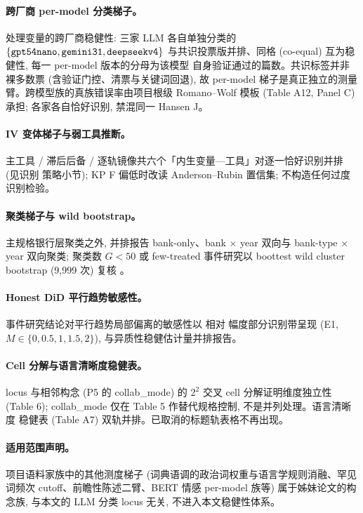 \paragraph{跨厂商 per-model 分类梯子。}
处理变量的跨厂商稳健性: 三家 LLM 各自单独分类的
$\{\texttt{gpt54nano},\texttt{gemini31},\texttt{deepseekv4}\}$
与共识投票版并排、同格 (co-equal) 互为稳健性, 每一 per-model 版本的分母为该模型
自身验证通过的篇数。共识标签并非裸多数票 (含验证门控、清票与关键词回退), 故
per-model 梯子是真正独立的测量臂。跨模型族的真族错误率由项目根级 Romano--Wolf
模板 (Table A12, Panel C) 承担; 各家各自恰好识别, 禁混同一 Hansen J。

\paragraph{IV 变体梯子与弱工具推断。}
主工具 / 滞后后备 / 逐轨镜像共六个「内生变量—工具」对逐一恰好识别并排 (见识别
策略小节); KP F 偏低时改读 Anderson--Rubin 置信集; 不构造任何过度识别检验。

\paragraph{聚类梯子与 wild bootstrap。}
主规格银行层聚类之外, 并排报告 bank-only、bank $\times$ year 双向与 bank-type
$\times$ year 双向聚类; 聚类数 $G<50$ 或 few-treated 事件研究以 boottest wild
cluster bootstrap (9{,}999 次) 复核 \parencite{roodman2019boottest}。

\paragraph{Honest DiD 平行趋势敏感性。}
事件研究结论对平行趋势局部偏离的敏感性以 \textcite{rambachan2023honestdid} 相对
幅度部分识别带呈现 (E1, $M \in \{0,0.5,1,1.5,2\}$), 与异质性稳健估计量并排报告。

\paragraph{Cell 分解与语言清晰度稳健表。}
locus 与相邻构念 (P5 的 collab\_mode) 的 $2^2$ 交叉 cell 分解证明维度独立性
(Table 6); collab\_mode 仅在 Table 5 作替代规格控制, 不是并列处理。语言清晰度
稳健表 (Table A7) 双轨并排。已取消的标题轨表格不再出现。

\paragraph{适用范围声明。}
项目语料家族中的其他测度梯子 (词典语调的政治词权重与语言学规则消融、罕见词频次
cutoff、前瞻性陈述二臂、BERT 情感 per-model 族等) 属于姊妹论文的构念族, 与本文的
LLM 分类 locus 无关, 不进入本文稳健性体系。

